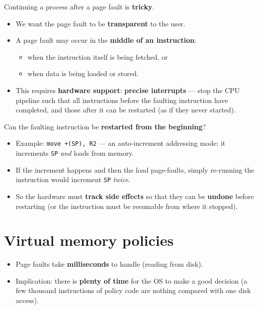 \documentclass[11pt,a4paper]{article}
\begin{document}
Continuing a process after a page fault is \textbf{tricky}.
\begin{itemize}
  \item We want the page fault to be \textbf{transparent} to the user.
  \item A page fault may occur in the \textbf{middle of an instruction}:
        \begin{itemize}
          \item when the instruction itself is being fetched, or
          \item when data is being loaded or stored.
        \end{itemize}
  \item This requires \textbf{hardware support}:
        \textbf{precise interrupts} --- stop the CPU pipeline such that
        all instructions before the faulting instruction have completed,
        and those after it can be restarted (as if they never started).
\end{itemize}

\begin{keybox}
Can the faulting instruction be \textbf{restarted from the beginning}?
\begin{itemize}
  \item Example: \texttt{move +(SP), R2} --- an auto-increment
        addressing mode: it increments \texttt{SP} \emph{and} loads from
        memory.
  \item If the increment happens and then the load page-faults,
        simply re-running the instruction would increment \texttt{SP}
        \emph{twice}.
  \item So the hardware must \textbf{track side effects} so that they can
        be \textbf{undone} before restarting (or the instruction must be
        resumable from where it stopped).
\end{itemize}
\end{keybox}

\section{Virtual memory policies}

\begin{keybox}
\begin{itemize}
  \item Page faults take \textbf{milliseconds} to handle (reading from disk).
  \item Implication: there is \textbf{plenty of time} for the OS to make a
        good decision (a few thousand instructions of policy code are
        nothing compared with one disk access).
\end{itemize}
\end{keybox}
\end{document}
